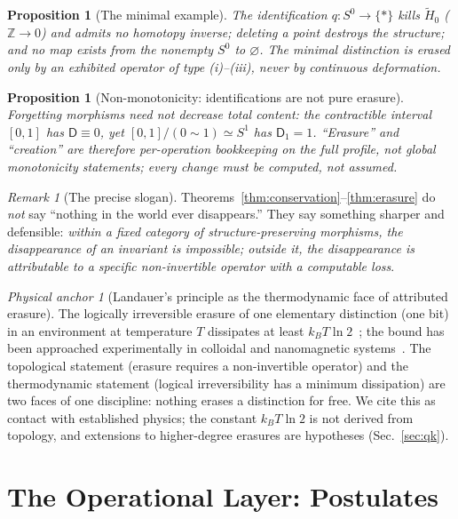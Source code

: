 \documentclass[11pt,a4paper]{article}
\newtheorem{proposition}[theorem]{Proposition}
\theoremstyle{definition}
\theoremstyle{remark}
\newtheorem{remark}[theorem]{Remark}
\newtheorem{anchor}[theorem]{Physical anchor}
\newcommand{\Szero}{S^{0}}
\newcommand{\Sone}{S^{1}}
\newcommand{\Z}{\mathbb{Z}}
\newcommand{\rH}{\widetilde H}
\newcommand{\Dd}{\mathsf{D}}
\begin{document}
\begin{proposition}[The minimal example]
\label{prop:s0}
The identification $q:\Szero\to\{*\}$ kills $\rH_{0}$ ($\Z\to0$) and admits no homotopy
inverse; deleting a point destroys the structure; and no map exists from the nonempty
$\Szero$ to $\varnothing$.  The minimal distinction is erased only by an exhibited operator of
type (i)--(iii), never by continuous deformation.
\end{proposition}

\begin{proposition}[Non-monotonicity: identifications are not pure erasure]
\label{prop:nonmonotone}
Forgetting morphisms need not decrease total content: the contractible interval $[0,1]$ has
$\Dd\equiv0$, yet $[0,1]/(0\!\sim\!1)\simeq\Sone$ has $\Dd_{1}=1$.  ``Erasure'' and
``creation'' are therefore per-operation bookkeeping on the full profile, not global
monotonicity statements; every change must be computed, not assumed.
\end{proposition}

\begin{remark}[The precise slogan]
Theorems~\ref{thm:conservation}--\ref{thm:erasure} do \emph{not} say ``nothing in the world
ever disappears.''  They say something sharper and defensible: \emph{within a fixed category of
structure-preserving morphisms, the disappearance of an invariant is impossible; outside it,
the disappearance is attributable to a specific non-invertible operator with a computable
loss}.
\end{remark}

\begin{anchor}[Landauer's principle as the thermodynamic face of attributed erasure]
\label{anchor:landauer}
The logically irreversible erasure of one elementary distinction (one bit) in an environment at
temperature $T$ dissipates at least $k_{B}T\ln2$~\cite{Landauer1961,Bennett1982}; the bound has
been approached experimentally in colloidal and nanomagnetic
systems~\cite{Berut2012,Jun2014,Hong2016}.  The topological statement (erasure requires a
non-invertible operator) and the thermodynamic statement (logical irreversibility has a minimum
dissipation) are two faces of one discipline: nothing erases a distinction for free.  We cite
this as contact with established physics; the constant $k_{B}T\ln2$ is not derived from
topology, and extensions to higher-degree erasures are hypotheses (Sec.~\ref{sec:qk}).
\end{anchor}

\section{The Operational Layer: Postulates}
\label{sec:physical}
\end{document}
